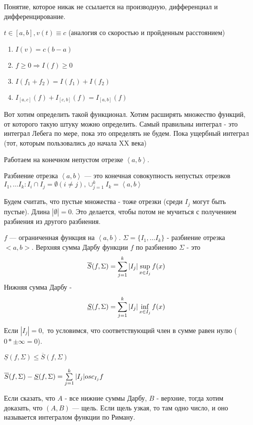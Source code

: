 \documentclass[12pt]{report}
\begin{document}
Понятие, которое никак не ссылается на производную, дифференциал и дифференцирование.

\begin{rem}
$t \in [a, b], v(t) \equiv c$ (аналогия со скоростью и пройденным расстоянием)
\begin{enumerate}
\item $I(v) = c(b - a)$
\item $f \ge 0 \Rightarrow I(f) \ge 0$
\item $I(f_1 + f_2) = I(f_1) + I(f_2)$
\item $I_{[a, c]}(f) + I_{[c, b]}(f) = I_{[a, b]}(f)$
\end{enumerate}
Вот хотим определить такой функционал. Хотим расширять множество функций, от которого такую штуку можно определить. Самый правильны интеграл - это интеграл Лебега по мере, пока это определять не будем. Пока ущербный интеграл (тот, которым пользовались до начала XX века)
\end{rem}

Работаем на конечном непустом отрезке $\left<a, b\right>$.

\begin{defn}
Разбиение отрезка $\left<a, b\right>$ --- это конечная совокупность непустых отрезков $I_1, \dots I_k: I_i \cap I_j = \emptyset (i \neq j), \cup_{j = 1}^k{I_k} = \left<a, b\right>$

Будем считать, что пустые множества - тоже отрезки (среди $I_j$ могут быть пустые). Длина $|\emptyset| = 0$. Это делается, чтобы потом не мучиться с получением разбиения из другого разбиения.
\end{defn}

\begin{defn}
$f$ --- ограниченная функция на $\left<a, b\right>$. $\Sigma = \{I_1, \dots I_k\}$ - разбиение отрезка $<a, b>$. Верхняя сумма Дарбу функции $f$ по разбиению $\Sigma$ - это
$$\overline{S}(f, \Sigma) = \sum\limits_{j = 1}^k{|I_j|}\sup_{x \in I_j}{f(x)}$$
Нижняя сумма Дарбу - 
$$\underline{S}(f, \Sigma) = \sum\limits_{j = 1}^k{|I_j|}\inf_{x \in I_j}{f(x)}$$

Если $|I_j| = 0,$ то условимся, что соответствующий член в сумме равен нулю ($0 * \pm \infty = 0$).
\end{defn}

\begin{note}
$\underline{S}(f, \Sigma) \le \overline{S}(f, \Sigma)$

$\overline{S}(f, \Sigma) - \underline{S}(f, \Sigma) = \sum\limits_{j = 1}^k{|I_j|osc_{I_j}{f}}$

Если сказать, что $A$ - все нижние суммы Дарбу, $B$ - верхние, тогда хотим доказать, что $(A, B)$ --- щель. Если щель узкая, то там одно число, и оно называется интегралом функции по Риману.
\end{note}
\end{document}
